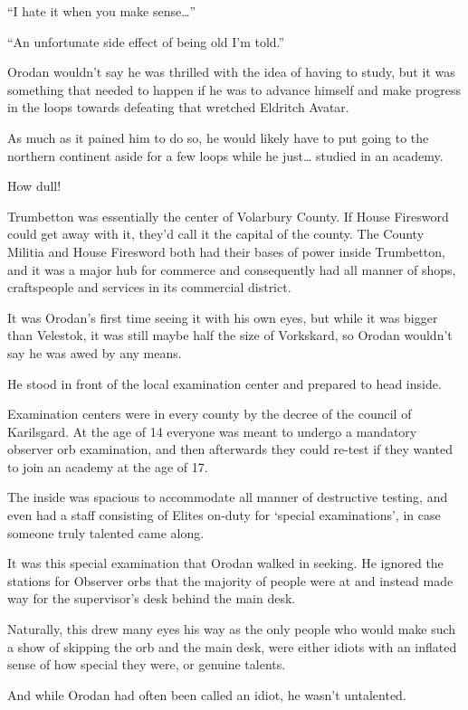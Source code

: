 \documentclass[a4paper,10pt]{book}
\begin{document}
“I hate it when you make sense…”\par
“An unfortunate side effect of being old I’m told.”\par
Orodan wouldn’t say he was thrilled with the idea of having to study, but it was something that needed to happen if he was to advance himself and make progress in the loops towards defeating that wretched Eldritch Avatar.\par
As much as it pained him to do so, he would likely have to put going to the northern continent aside for a few loops while he just… studied in an academy.\par
How dull!\par
\par
Trumbetton was essentially the center of Volarbury County. If House Firesword could get away with it, they’d call it the capital of the county. The County Militia and House Firesword both had their bases of power inside Trumbetton, and it was a major hub for commerce and consequently had all manner of shops, craftspeople and services in its commercial district.\par
It was Orodan’s first time seeing it with his own eyes, but while it was bigger than Velestok, it was still maybe half the size of Vorkskard, so Orodan wouldn’t say he was awed by any means.\par
He stood in front of the local examination center and prepared to head inside.\par
Examination centers were in every county by the decree of the council of Karilsgard. At the age of 14 everyone was meant to undergo a mandatory observer orb examination, and then afterwards they could re-test if they wanted to join an academy at the age of 17.\par
The inside was spacious to accommodate all manner of destructive testing, and even had a staff consisting of Elites on-duty for ‘special examinations’, in case someone truly talented came along.\par
It was this special examination that Orodan walked in seeking. He ignored the stations for Observer orbs that the majority of people were at and instead made way for the supervisor’s desk behind the main desk.\par
Naturally, this drew many eyes his way as the only people who would make such a show of skipping the orb and the main desk, were either idiots with an inflated sense of how special they were, or genuine talents.\par
And while Orodan had often been called an idiot, he wasn’t untalented.\par
\end{document}

